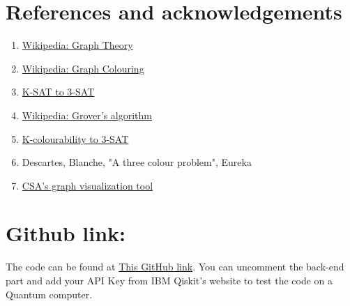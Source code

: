 \documentclass{article}
\begin{document}
\section{References and acknowledgements}

\begin{enumerate}
    \item \href{https://en.wikipedia.org/wiki/Graph_theory}{Wikipedia: Graph Theory}
    \item \href{https://en.wikipedia.org/wiki/Graph_coloring}{Wikipedia: Graph Colouring}
    \item \href{https://cse.iitkgp.ac.in/~palash/2018AlgoDesignAnalysis/SAT-3SAT.pdf }{K-SAT to 3-SAT}
    \item \href{https://en.wikipedia.org/wiki/Grover%27s_algorithm}{Wikipedia: Grover's algorithm}
    \item \href{https://research.ijcaonline.org/encc/number1/encc004.pdf}{K-colourability to 3-SAT}
    \item Descartes, Blanche, "A three colour problem", Eureka
    \item \href{https://csacademy.com/app/graph_editor/}{CSA's graph visualization tool}
\end{enumerate}

\section{Github link:}

The code can be found at \href{https://github.com/yashnator/Graph-colouring-with-Quantum-Computing}{This GitHub link}. You can uncomment the back-end part and add your API Key from IBM Qiskit's website to test the code on a Quantum computer.
\end{document}
